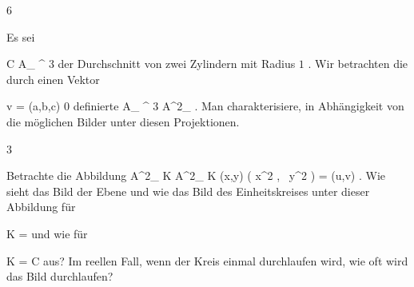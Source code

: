 {6}
{





Es sei

\mavergleichskette
{\vergleichskette
{ C
}
{ \subseteq }{ { {\mathbb A}_{ \R }^{  3   } }
}
{  }{
}
{    }{
}
{   }{
}
}
{}{}{}
der Durchschnitt von zwei Zylindern
 {} {}
mit Radius $1$
 {} {.}
Wir betrachten die durch einen Vektor

\mavergleichskette
{\vergleichskette
{ v
}
{ = }{ (a,b,c)
}
{ \neq }{ 0
}
{    }{
}
{   }{
}
}
{}{}{}
definierte
 { { {\mathbb A}_{ \R }^{  3   } } } { {\mathbb A}^{2}_{\R}
} {.}
Man charakterisiere, in Abhängigkeit von
 die möglichen Bilder unter diesen Projektionen.





}
{} {}

{3}
{





Betrachte die Abbildung
\maabbeledisp {} { {\mathbb A}^{2}_{ K } } { {\mathbb A}^{2}_{ K }
} { (x,y) } {  \left(  x^2   , \,   y^2                   \right) = (u,v)
} {.}
Wie sieht das Bild der Ebene und wie das Bild des Einheitskreises unter dieser Abbildung für

\mavergleichskette
{\vergleichskette
{ K
}
{ = }{ \R
}
{  }{
}
{    }{
}
{   }{
}
}
{}{}{}
und wie für

\mavergleichskette
{\vergleichskette
{ K
}
{ = }{ {\mathbb C}
}
{  }{
}
{    }{
}
{   }{
}
}
{}{}{}
aus? Im reellen Fall, wenn der Kreis einmal durchlaufen wird, wie oft wird das Bild durchlaufen?





}
{} {}
